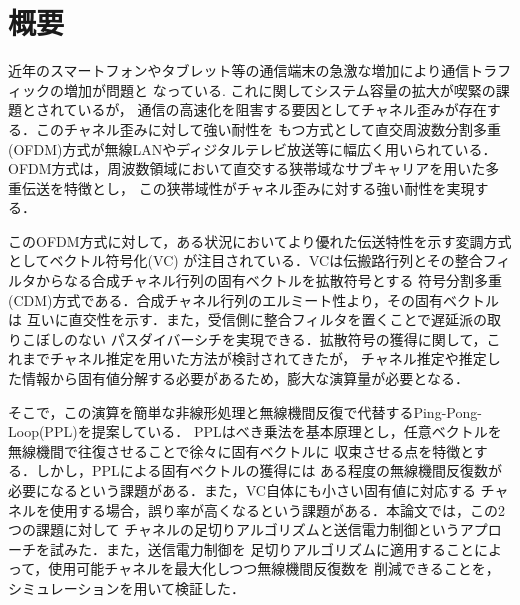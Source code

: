 \chapter*{概要} %
\thispagestyle{empty}

\thispagestyle{empty}
近年のスマートフォンやタブレット等の通信端末の急激な増加により通信トラフィックの増加が問題と
なっている.
これに関してシステム容量の拡大が喫緊の課題とされているが，
通信の高速化を阻害する要因としてチャネル歪みが存在する．このチャネル歪みに対して強い耐性を
もつ方式として直交周波数分割多重(OFDM)方式が無線LANやディジタルテレビ放送等に幅広く用いられている．
OFDM方式は，周波数領域において直交する狭帯域なサブキャリアを用いた多重伝送を特徴とし，
この狭帯域性がチャネル歪みに対する強い耐性を実現する．

このOFDM方式に対して，ある状況においてより優れた伝送特性を示す変調方式としてベクトル符号化(VC)
が注目されている．VCは伝搬路行列とその整合フィルタからなる合成チャネル行列の固有ベクトルを拡散符号とする
符号分割多重(CDM)方式である．合成チャネル行列のエルミート性より，その固有ベクトルは
互いに直交性を示す．また，受信側に整合フィルタを置くことで遅延派の取りこぼしのない
パスダイバーシチを実現できる．拡散符号の獲得に関して，これまでチャネル推定を用いた方法が検討されてきたが，
チャネル推定や推定した情報から固有値分解する必要があるため，膨大な演算量が必要となる．

そこで，この演算を簡単な非線形処理と無線機間反復で代替するPing-Pong-Loop(PPL)を提案している．
PPLはべき乗法を基本原理とし，任意ベクトルを無線機間で往復させることで徐々に固有ベクトルに
収束させる点を特徴とする．しかし，PPLによる固有ベクトルの獲得には
ある程度の無線機間反復数が必要になるという課題がある．また，VC自体にも小さい固有値に対応する
チャネルを使用する場合，誤り率が高くなるという課題がある．本論文では，この2つの課題に対して
チャネルの足切りアルゴリズムと送信電力制御というアプローチを試みた．また，送信電力制御を
足切りアルゴリズムに適用することによって，使用可能チャネルを最大化しつつ無線機間反復数を
削減できることを，シミュレーションを用いて検証した．